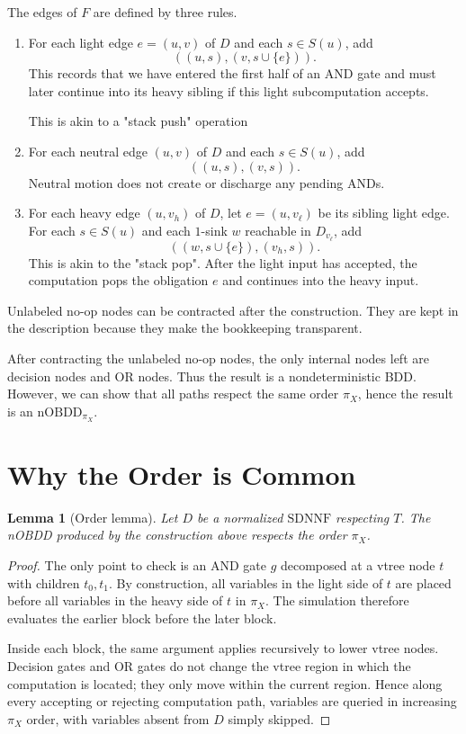 \documentclass[11pt]{article}
\theoremstyle{plain}
\newtheorem{lemma}[theorem]{Lemma}
\theoremstyle{definition}
\theoremstyle{remark}
\newcommand{\nOBDD}{\mathrm{nOBDD}}
\newcommand{\SDNNF}{\mathrm{SDNNF}}
\begin{document}
The edges of $F$ are defined by three rules.
\begin{enumerate}[label=(\arabic*),noitemsep]
  \item For each light edge $e=(u,v)$ of $D$ and each $s\in S(u)$, add
  \[
    ((u,s),(v,s\cup\{e\})).
  \]
  This records that we have entered the first half of an AND gate and must later
  continue into its heavy sibling if this light subcomputation accepts.

  This is akin to a "stack push" operation

  \item For each neutral edge $(u,v)$ of $D$ and each $s\in S(u)$, add
  \[
    ((u,s),(v,s)).
  \]
  Neutral motion does not create or discharge any pending ANDs.

  \item For each heavy edge $(u,v_h)$ of $D$, let $e=(u,v_\ell)$ be its sibling
  light edge.  For each $s\in S(u)$ and each $1$-sink $w$ reachable in
  $D_{v_\ell}$, add
  \[
    ((w,s\cup\{e\}),(v_h,s)).
  \]
  This is akin to the "stack pop". After the light input has accepted, the computation
  pops the obligation $e$ and continues into the heavy input.
\end{enumerate}

Unlabeled no-op nodes can be contracted after the construction.  They are kept
in the description because they make the bookkeeping transparent.

After contracting the unlabeled no-op nodes, the only internal nodes left are
decision nodes and OR nodes.  Thus the result is a nondeterministic BDD. However,
we can show that all paths respect the same order $\pi_X$, hence the result is
an $\nOBDD_{\pi_X}$.

\section{Why the Order is Common}

\begin{lemma}[Order lemma]
Let $D$ be a normalized $\SDNNF$ respecting $T$.  The nOBDD produced by the
construction above respects the order $\pi_X$.
\end{lemma}

\begin{proof}
The only point to check is an AND gate $g$ decomposed at a vtree node $t$ with
children $t_0,t_1$.  By construction, all variables in the light side of $t$ are
placed before all variables in the heavy side of $t$ in $\pi_X$.  The simulation
therefore evaluates the earlier block before the later block.

Inside each block, the same argument applies recursively to lower vtree nodes.
Decision gates and OR gates do not change the vtree region in which the
computation is located; they only move within the current region.  Hence along
every accepting or rejecting computation path, variables are queried in
increasing $\pi_X$ order, with variables absent from $D$ simply skipped.
\end{proof}
\end{document}
